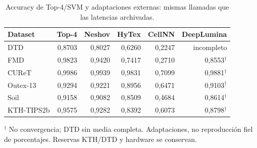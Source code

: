 \begin{table}[!htbp]\centering
\fontsize{8}{10}\selectfont\setlength{\tabcolsep}{4pt}
\caption{Accuracy de Top-4/SVM y adaptaciones externas: mismas llamadas que las latencias archivadas.}\label{tab:tm-externos-accuracy}
\begin{tabular}{@{}lrrrrr@{}}\toprule
Dataset & Top-4 & Neshov & HyTex & CellNN & DeepLumina\\\midrule
DTD & 0,8703 & 0,8027 & 0,6260 & 0,2247 & incompleto\\
FMD & 0,9823 & 0,9420 & 0,7417 & 0,2710 & 0,8553$^\dagger$\\
CUReT & 0,9986 & 0,9939 & 0,9831 & 0,7099 & 0,9881$^\dagger$\\
Outex-13 & 0,9294 & 0,9221 & 0,8956 & 0,6471 & 0,9103$^\dagger$\\
Soil & 0,9158 & 0,9082 & 0,8509 & 0,4684 & 0,8614$^\dagger$\\
KTH-TIPS2b & 0,9575 & 0,9282 & 0,8392 & 0,6073 & 0,8798$^\dagger$\\
\bottomrule\end{tabular}
\par\smallskip\begin{minipage}{0.98\textwidth}\footnotesize $^\dagger$ No convergencia; DTD sin media completa. Adaptaciones, no reproducción fiel de porcentajes. Reservas KTH/DTD y hardware se conservan.\end{minipage}
\end{table}
